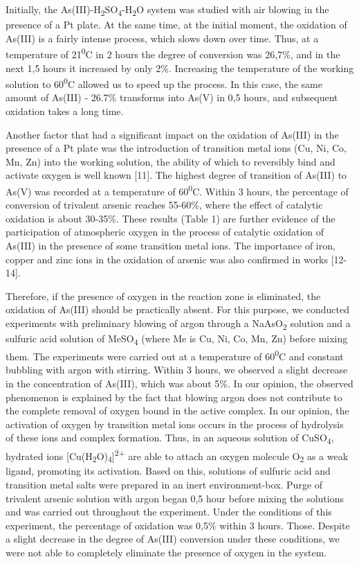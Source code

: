 Initially, the
As(III)-H\textsubscript{2}SO\textsubscript{4}-H\textsubscript{2}O system
was studied with air blowing in the presence of a Pt plate. At the same
time, at the initial moment, the oxidation of As(III) is a fairly
intense process, which slows down over time. Thus, at a temperature of
21\textsuperscript{0}C in 2 hours the degree of conversion was 26,7\%,
and in the next 1,5 hours it increased by only 2\%. Increasing the
temperature of the working solution to 60\textsuperscript{0}C allowed us
to speed up the process. In this case, the same amount of As(III) -
26.7\% transforms into As(V) in 0,5 hours, and subsequent oxidation
takes a long time.

Another factor that had a significant impact on the oxidation of As(III)
in the presence of a Pt plate was the introduction of transition metal
ions (Cu, Ni, Co, Mn, Zn) into the working solution, the ability of
which to reversibly bind and activate oxygen is well known {[}11{]}. The
highest degree of transition of As(III) to As(V) was recorded at a
temperature of 60\textsuperscript{0}C. Within 3 hours, the percentage of
conversion of trivalent arsenic reaches 55-60\%, where the effect of
catalytic oxidation is about 30-35\%. These results (Table 1) are
further evidence of the participation of atmospheric oxygen in the
process of catalytic oxidation of As(III) in the presence of some
transition metal ions. The importance of iron, copper and zinc ions in
the oxidation of arsenic was also confirmed in works {[}12-14{]}.

Therefore, if the presence of oxygen in the reaction zone is eliminated,
the oxidation of As(III) should be practically absent. For this purpose,
we conducted experiments with preliminary blowing of argon through a
NaAsO\textsubscript{2} solution and a sulfuric acid solution of
MeSO\textsubscript{4} (where Me is Cu, Ni, Co, Mn, Zn) before mixing
them. The experiments were carried out at a temperature of
60\textsuperscript{0}C and constant bubbling with argon with stirring.
Within 3 hours, we observed a slight decrease in the concentration of
As(III), which was about 5\%. In our opinion, the observed phenomenon is
explained by the fact that blowing argon does not contribute to the
complete removal of oxygen bound in the active complex. In our opinion,
the activation of oxygen by transition metal ions occurs in the process
of hydrolysis of these ions and complex formation. Thus, in an aqueous
solution of CuSO\textsubscript{4}, hydrated ions
{[}Cu(H\textsubscript{2}O)\textsubscript{4}{]}\textsuperscript{2+} are
able to attach an oxygen molecule O\textsubscript{2} as a weak ligand,
promoting its activation. Based on this, solutions of sulfuric acid and
transition metal salts were prepared in an inert environment-box. Purge
of trivalent arsenic solution with argon began 0,5 hour before mixing
the solutions and was carried out throughout the experiment. Under the
conditions of this experiment, the percentage of oxidation was 0,5\%
within 3 hours. Those. Despite a slight decrease in the degree of
As(III) conversion under these conditions, we were not able to
completely eliminate the presence of oxygen in the system.

